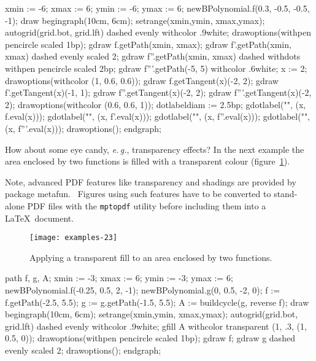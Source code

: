 \documentclass{article}
\newcommand*{\cmd}[1]{\texttt{#1}}
\newcommand*{\name}[1]{\textsf{#1}}
\begin{document}
\begin{listing}
  xmin := -6; xmax := 6;
  ymin := -6; ymax := 6;
  newBPolynomial.f(0.3, -0.5, -0.5, -1);
  draw begingraph(10cm, 6cm);
    setrange(xmin,ymin, xmax,ymax);
    autogrid(grid.bot, grid.lft) dashed evenly withcolor .9white;
    drawoptions(withpen pencircle scaled 1bp);
    gdraw f.getPath(xmin, xmax);
    gdraw f'.getPath(xmin, xmax) dashed evenly scaled 2;
    gdraw f''.getPath(xmin, xmax) dashed withdots
      withpen pencircle scaled 2bp;
    gdraw f'''.getPath(-5, 5) withcolor .6white;
    x := 2;
    drawoptions(withcolor (1, 0.6, 0.6));
    gdraw f.getTangent(x)(-2, 2);
    gdraw f'.getTangent(x)(-1, 1);
    gdraw f''.getTangent(x)(-2, 2);
    gdraw f'''.getTangent(x)(-2, 2);
    drawoptions(withcolor (0.6, 0.6, 1));
    dotlabeldiam := 2.5bp;
    gdotlabel("", (x, f.eval(x)));
    gdotlabel("", (x, f'.eval(x)));
    gdotlabel("", (x, f''.eval(x)));
    gdotlabel("", (x, f'''.eval(x)));
    drawoptions();
  endgraph;
\end{listing}

How about some eye candy, \emph{e.\,g.}, transparency effects?  In the next example the area enclosed by two functions is filled with a transparent colour (figure~\ref{fig:transparency}).

Note, advanced PDF features like transparency and shadings are provided by package \name{metafun}.~\cite{mp:metafun}  Figures using such features have to be converted to stand-alone PDF files with the \cmd{mptopdf} utility before including them into a \LaTeX\ document.

\begin{figure}
    \centering
    \texttt{[image: examples-23]}
    \caption{Applying a transparent fill to an area enclosed by two functions.}
    \label{fig:transparency}
\end{figure}

\begin{listing}
path f, g, A;
  xmin := -3; xmax := 6;
  ymin := -3; ymax := 6;
  newBPolynomial.f(-0.25, 0.5, 2, -1);
  newBPolynomial.g(0, 0.5, -2, 0);
  f := f.getPath(-2.5, 5.5);
  g := g.getPath(-1.5, 5.5);
  A := buildcycle(g, reverse f);
  draw begingraph(10cm, 6cm);
    setrange(xmin,ymin, xmax,ymax);
    autogrid(grid.bot, grid.lft) dashed evenly withcolor .9white;
    gfill A withcolor transparent (1, .3, (1, 0.5, 0));
    drawoptions(withpen pencircle scaled 1bp);
    gdraw f;
    gdraw g dashed evenly scaled 2;
    drawoptions();
  endgraph;
\end{listing}
\end{document}
